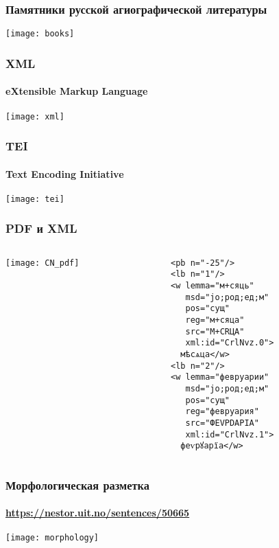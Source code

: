 \begin{frame}
  \frametitle{Памятники русской агиографической литературы}

  \begin{center}
    \texttt{[image: books]}
  \end{center}
\end{frame}

\begin{frame}
  \frametitle{XML}
  \framesubtitle{eXtensible Markup Language}

  \begin{center}
    \texttt{[image: xml]}
  \end{center}
\end{frame}

\begin{frame}
  \frametitle{TEI}
  \framesubtitle{Text Encoding Initiative}

  \begin{center}
    \texttt{[image: tei]}
  \end{center}
\end{frame}

\begin{frame}[fragile]
  \frametitle{PDF и XML}

  \begin{columns}[c]
    \begin{column}{6cm}
      \texttt{[image: CN\_pdf]}
    \end{column}

    \begin{column}{6cm}
      \begin{Verbatim}[fontsize=\footnotesize]
<pb n="-25"/>
<lb n="1"/>
<w lemma="м+сяць"
   msd="jo;род;ед;м"
   pos="сущ"
   reg="м+сяца"
   src="М+СRЦА"
   xml:id="CrlNvz.0">
  мѣсѧца</w>
<lb n="2"/>
<w lemma="февруарии"
   msd="jo;род;ед;м"
   pos="сущ"
   reg="февруария"
   src="ФЕVРDАРIА"
   xml:id="CrlNvz.1">
  феѵрꙋарїа</w>
\end{Verbatim}
    \end{column}
  \end{columns}
\end{frame}

\begin{frame}
  \frametitle{Морфологическая разметка}
  \framesubtitle{\url{https://nestor.uit.no/sentences/50665}}

  \begin{center}
    \texttt{[image: morphology]}
  \end{center}
\end{frame}

